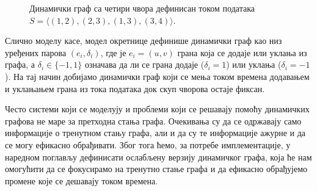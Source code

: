 \begin{figure}[hbt]
\centering
\begingroup
{}




\endgroup
\caption{Динамички граф са четири чвора дефинисан током података $S = \langle (1, 2), (2, 3), (1, 3), (3, 4)\rangle$.}
\label{fig:primer_dinamickog_grafa1}
\end{figure}

Слично моделу касе, модел окретнице дефинише динамички граф као низ уређених парова $(e_i, \delta_i)$, где је $e_i=(u,v)$ грана која се додаје или уклања из графа, а $\delta_i \in \{-1, 1\}$ означава да ли се грана додаје ($\delta_i = 1$) или уклања ($\delta_i = -1$). На тај начин добијамо динамички граф који се мења током времена додавањем и уклањањем грана из тока података док скуп чворова остаје фиксан.

Често системи који се моделују и проблеми који се решавају помоћу динамичких графова не маре за претходна стања графа. Очекивања су да се одржавају само информације о тренутном стању графа, али и да су те информације ажурне и да се могу ефикасно обрађивати. Због тога ћемо, за потребе имплементације, у наредном поглављу дефинисати ослабљену верзију динамичког графа, која ће нам омогућити да се фокусирамо на тренутно стање графа и да ефикасно обрађујемо промене које се дешавају током времена.

